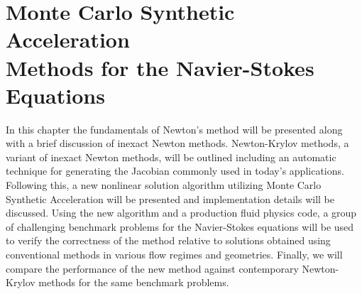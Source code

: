 \chapter{Monte Carlo Synthetic Acceleration\\ Methods for the
  Navier-Stokes\\ Equations\ }
\label{ch:nonlinear_problem}

In this chapter the fundamentals of Newton's method will be presented
along with a brief discussion of inexact Newton methods. Newton-Krylov
methods, a variant of inexact Newton methods, will be outlined
including an automatic technique for generating the Jacobian commonly
used in today's applications. Following this, a new nonlinear solution
algorithm utilizing Monte Carlo Synthetic Acceleration will be
presented and implementation details will be discussed. Using the new
algorithm and a production fluid physics code, a group of challenging
benchmark problems for the Navier-Stokes equations will be used to
verify the correctness of the method relative to solutions obtained
using conventional methods in various flow regimes and
geometries. Finally, we will compare the performance of the new method
against contemporary Newton-Krylov methods for the same benchmark
problems.

